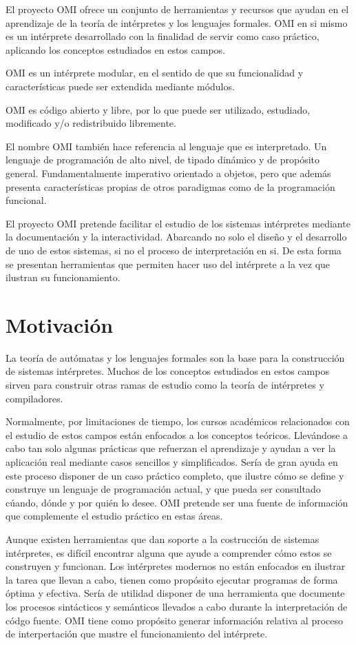 El proyecto OMI ofrece un conjunto de herramientas y recursos que ayudan en el aprendizaje 
de la teoría de intérpretes y los lenguajes formales. OMI en si mismo es un intérprete desarrollado 
con la finalidad de servir como caso práctico, aplicando los conceptos estudiados en 
estos campos. 

OMI es un intérprete modular, en el sentido de que su funcionalidad y características puede ser extendida mediante módulos. 

OMI es código abierto y libre, por lo que puede ser utilizado, estudiado, modificado y/o redistribuido libremente.

El nombre OMI también hace referencia al lenguaje que es interpretado. Un lenguaje de programación de alto nivel, de tipado dinámico y de propósito general. Fundamentalmente 
imperativo orientado a objetos, pero que además presenta características propias de otros paradigmas como de la programación funcional. 

El proyecto OMI pretende facilitar el estudio de los sistemas intérpretes mediante la documentación y la interactividad. Abarcando no solo el diseño y el desarrollo
de uno de estos sistemas, si no el proceso de interpretación en si. De esta forma se presentan herramientas que permiten hacer uso del intérprete a la vez que ilustran
su funcionamiento. 

\section{Motivación}
La teoría de autómatas y los lenguajes formales son la base para la construcción de sistemas intérpretes. Muchos de los conceptos estudiados 
en estos campos sirven para construir otras ramas de estudio como la teoría de intérpretes y compiladores. 

Normalmente, por limitaciones de tiempo, los cursos académicos relacionados con el estudio de estos campos están enfocados a los conceptos teóricos. 
Llevándose a cabo tan solo algunas prácticas que refuerzan el aprendizaje y ayudan a ver la aplicación real mediante casos sencillos y simplificados. 
Sería de gran ayuda en este proceso disponer de un caso práctico completo, que ilustre cómo se define y construye un lenguaje de programación actual, 
y que pueda ser consultado cúando, dónde y por quién lo desee. OMI pretende ser una fuente de información que complemente el estudio práctico en estas áreas.

Aunque existen herramientas que dan soporte a la costrucción de sistemas intérpretes, es difícil encontrar alguna que ayude a comprender cómo estos se construyen y funcionan. 
Los intérpretes modernos no están enfocados en ilustrar la tarea que llevan a cabo, tienen como propósito ejecutar programas de forma óptima y efectiva. Sería de utilidad disponer de una 
herramienta que documente los procesos sintácticos y semánticos llevados a cabo durante la interpretación de códgo fuente. OMI tiene como propósito generar información relativa al proceso 
de interpertación que mustre el funcionamiento del intérprete. 

